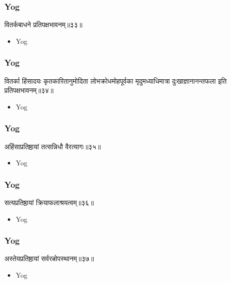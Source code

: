 \begin{frame}[fragile]\frametitle{Yog}
\begin{sanskrit}
वितर्कबाधने प्रतिपक्षभावनम्॥३३॥
\end{sanskrit}
	\begin{itemize}
	\item Yog 
	\end{itemize}
\end{frame}



\begin{frame}[fragile]\frametitle{Yog}
\begin{sanskrit}
वितर्का हिंसादयः कृतकारितानुमोदिता लोभक्रोधमोहपूर्वका मृदुमध्याधिमात्रा दुःखाज्ञानानन्तफला इति प्रतिपक्षभावनम्॥३४॥
\end{sanskrit}
	\begin{itemize}
	\item Yog 
	\end{itemize}
\end{frame}

\begin{frame}[fragile]\frametitle{Yog}
\begin{sanskrit}
अहिंसाप्रतिष्ठायां तत्सन्निधौ वैरत्यागः॥३५॥
\end{sanskrit}
	\begin{itemize}
	\item Yog 
	\end{itemize}
\end{frame}


\begin{frame}[fragile]\frametitle{Yog}
\begin{sanskrit}
सत्यप्रतिष्ठायां क्रियाफलाश्रयत्वम्॥३६॥
\end{sanskrit}
	\begin{itemize}
	\item Yog 
	\end{itemize}
\end{frame}


\begin{frame}[fragile]\frametitle{Yog}
\begin{sanskrit}
अस्तेयप्रतिष्ठायां सर्वरत्नोपस्थानम्॥३७॥
\end{sanskrit}
	\begin{itemize}
	\item Yog 
	\end{itemize}
\end{frame}


